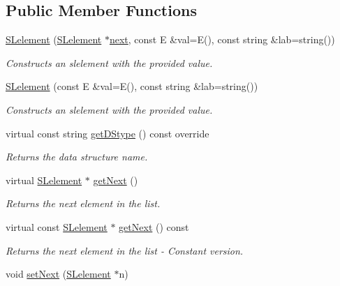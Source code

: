 \subsection*{Public Member Functions}
\begin{DoxyCompactItemize}
\item 
\hyperlink{classbridges_1_1datastructure_1_1_s_lelement_ac69e99f5b2b729a217160ee0517751aa}{S\+Lelement} (\hyperlink{classbridges_1_1datastructure_1_1_s_lelement}{S\+Lelement} $\ast$\hyperlink{classbridges_1_1datastructure_1_1_s_lelement_afc016a593a4a5aba82021ee34edadbfc}{next}, const E \&val=E(), const string \&lab=string())
\begin{DoxyCompactList}\small\item\em Constructs an slelement with the provided value. \end{DoxyCompactList}\item 
\hyperlink{classbridges_1_1datastructure_1_1_s_lelement_a2f56e5f74a2cb43ab6ea718ae5bfdcbf}{S\+Lelement} (const E \&val=E(), const string \&lab=string())
\begin{DoxyCompactList}\small\item\em Constructs an slelement with the provided value. \end{DoxyCompactList}\item 
virtual const string \hyperlink{classbridges_1_1datastructure_1_1_s_lelement_a602156aacacd73d1faa365d68d8af31b}{get\+D\+Stype} () const override
\begin{DoxyCompactList}\small\item\em Returns the data structure name. \end{DoxyCompactList}\item 
virtual \hyperlink{classbridges_1_1datastructure_1_1_s_lelement}{S\+Lelement} $\ast$ \hyperlink{classbridges_1_1datastructure_1_1_s_lelement_ae43dd771d9ced7cb17f1d35f34cd9a42}{get\+Next} ()
\begin{DoxyCompactList}\small\item\em Returns the next element in the list. \end{DoxyCompactList}\item 
virtual const \hyperlink{classbridges_1_1datastructure_1_1_s_lelement}{S\+Lelement} $\ast$ \hyperlink{classbridges_1_1datastructure_1_1_s_lelement_a8c62cb82fa64bbfe9ebb7334a5fea417}{get\+Next} () const
\begin{DoxyCompactList}\small\item\em Returns the next element in the list -\/ Constant version. \end{DoxyCompactList}\item 
void \hyperlink{classbridges_1_1datastructure_1_1_s_lelement_acf736223b4cd27b0771b262870d70b94}{set\+Next} (\hyperlink{classbridges_1_1datastructure_1_1_s_lelement}{S\+Lelement} $\ast$n)
\end{DoxyCompactItemize}
